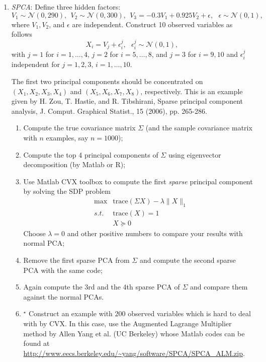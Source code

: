 \documentclass[11pt]{article}
\def\NN{{\mathcal N}}
\def\E{{\mathbb E}}
\def\tr{{\mathrm{trace}}}
\begin{document}
\begin{enumerate}
\item {\em SPCA}: Define three hidden factors: 
\[ V_1 \sim \NN(0,290), \ \ V_2 \sim \NN(0,300), \ \ V_3 = -0.3 V_1 + 0.925  V_2 + \epsilon, \ \ \ \epsilon \sim \NN(0,1), \]
where $V_1,V_2$, and $\epsilon$ are independent. Construct 10 observed variables as follows
\[ X_i = V_j + \epsilon^j_i, \ \ \ \epsilon^j_i \sim \NN(0,1), \] 
with $j=1$ for $i=1,\ldots,4$, $j=2$ for $i=5,\ldots,8$, and $j=3$ for $i=9,10$ and $\epsilon^j_i$ independent for $j=1,2,3$, $i=1,\ldots,10$. 

The first two principal components should be concentrated on $(X_1,X_2,X_3,X_4)$ and $(X_5,X_6,X_7,X_8)$, respectively. This is an example given
by H. Zou, T. Hastie, and R. Tibshirani, Sparse principal component analysis, J. Comput. Graphical Statist., 15 (2006), pp. 265-286.

\begin{enumerate}
\item Compute the true covariance matrix $\Sigma$ (and the sample covariance matrix with $n$ examples, say $n=1000$);
\item Compute the top 4 principal components of $\Sigma$ using eigenvector decomposition (by Matlab or R);
\item Use Matlab CVX toolbox to compute the first \emph{sparse} principal component by solving the SDP problem
\begin{eqnarray*}
& \max & \tr (\Sigma X) - \lambda \|X\|_1 \\
 & s.t. & \tr (X) = 1 \\
 & & X \succeq 0
\end{eqnarray*}
Choose $\lambda =0$ and other positive numbers to compare your results with normal PCA;  

\item Remove the first sparse PCA from $\Sigma$ and compute the second sparse PCA with the same code;
\item Again compute the 3rd and the 4th sparse PCA of $\Sigma$ and compare them against the normal PCAs.  
\item $^\star$ Construct an example with $200$ observed variables which is hard to deal with by CVX. 
In this case, use the Augmented Lagrange Multiplier method by Allen Yang et al. (UC Berkeley) whose Matlab codes can be found at 
\url{http://www.eecs.berkeley.edu/~yang/software/SPCA/SPCA_ALM.zip}. 
\end{enumerate}
%
%

\end{enumerate}
\end{document}
